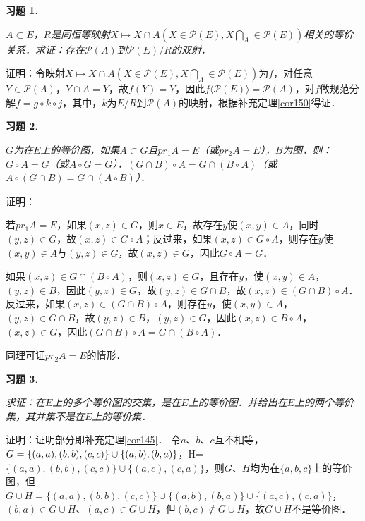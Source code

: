 \documentclass[12pt, a4paper, oneside]{book}
\newtheorem{exer}{习题}
\begin{document}
			\begin{exer}\label{exer69}
				\hfill\par
				$A\subset E$，$R$是同恒等映射$X\mapsto X\cap A(X\in \mathcal{P}(E), X\bigcap\limits_A\in \mathcal{P}(E))$相关的等价关系．求证：存在$\mathcal{P}(A)$到$\mathcal{P}(E)/R$的双射．
			\end{exer}
			证明：令映射$X\mapsto X\cap A(X\in \mathcal{P}(E), X\bigcap\limits_A\in \mathcal{P}(E))$为$f$，对任意$Y\in \mathcal{P}(A)$，$Y\cap A=Y$，故$f(Y)=Y$，因此$f\langle\mathcal{P}(E)\rangle=\mathcal{P}(A)$，对$f$做规范分解$f=g\circ k\circ j$，其中，$k$为$E/R$到$\mathcal{P}(A)$的映射，根据补充定理\ref{cor150}得证．
			
			\begin{exer}\label{exer70}
				\hfill\par
				$G$为在$E$上的等价图，如果$A\subset G$且$pr_1A=E$（或$pr_2A=E$），$B$为图，则：$G\circ A=G$（或$A\circ G=G$），$(G\cap B)\circ A=G\cap(B\circ A)$（或$A\circ (G\cap B)=G\cap(A\circ B)$）．
			\end{exer}
			证明：
			\par
			若$pr_1A=E$，如果$(x, z)\in G$，则$x\in E$，故存在$y$使$(x, y)\in A$，同时$(y, z)\in G$，故$(x, z)\in G\circ A$；反过来，如果$(x, z)\in G\circ A$，则存在$y$使$(x, y)\in A\text{与}(y, z)\in G$，故$(x, z) \in G$，因此$G\circ A=G$．
			\par
			如果$(x, z)\in G\cap(B\circ A)$，则$(x, z)\in G$，且存在$y$，使$(x, y)\in A$，$(y, z)\in B$，因此$(y, z)\in G$，故$(y, z)\in G\cap B$，故$(x, z)\in (G\cap B)\circ A$．反过来，如果$(x, z)\in (G\cap B)\circ A$，则存在$y$，使$(x, y)\in A$，$(y, z)\in G\cap B$，故$(y, z)\in B$，$(y, z)\in G$，因此$(x, z)\in B\circ A$，$(x, z)\in G$，因此$(G\cap B)\circ A=G\cap(B\circ A)$．
			\par
			同理可证$pr_2A=E$的情形．
			
			\begin{exer}\label{exer71}
				\hfill\par
				求证：在$E$上的多个等价图的交集，是在$E$上的等价图．并给出在$E$上的两个等价集，其并集不是在$E$上的等价集．
			\end{exer}
			证明：证明部分即补充定理\ref{cor145}．
			令$a$、$b$、$c$互不相等，$G=\\\{(a, a), (b, b), (c, c)\}\cup\{(a, b), (b, a)\}$，H=$\{(a, a), (b, b), (c, c)\}\cup\{(a, c), (c, a)\}$，则$G$、$H$均为在$\{a, b, c\}$上的等价图，但$G\cup H=\{(a, a), (b, b), (c, c)\}\cup\{(a, b), (b, a)\}\cup\{(a, c), (c, a)\}$，$(b, a)\in G\cup H$、$(a, c)\in G\cup H$，但$(b, c)\notin G\cup H$，故$G\cup H$不是等价图．
			
\end{document}
